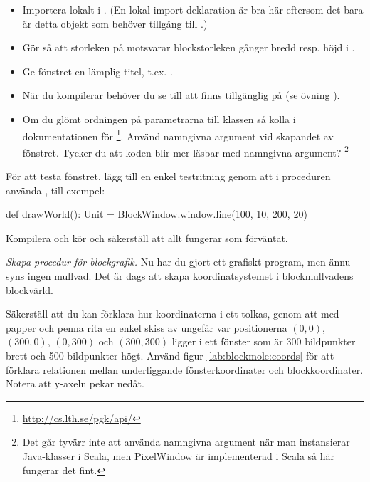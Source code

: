 \begin{itemize}%
  \item Importera  lokalt i . (En lokal import-deklaration är bra här eftersom det bara är detta objekt som behöver tillgång till .)
  \item Gör så att storleken på  motsvarar blockstorleken gånger bredd resp. höjd i .
  \item Ge fönstret en lämplig titel, t.ex. .
  \item När du kompilerar behöver du se till att  finns tillgänglig på  (se övning \texttt{\ExeWeekFOUR}).
  \item Om du glömt ordningen på parametrarna till klassen  så kolla i dokumentationen för  \footnote{\url{http://cs.lth.se/pgk/api/}}. Använd namngivna argument vid skapandet av fönstret. Tycker du att koden blir mer läsbar med namngivna argument? \footnote{Det går tyvärr inte att använda namngivna argument när man instansierar Java-klasser i Scala, men PixelWindow är implementerad i Scala så här fungerar det fint.}
\end{itemize}

För att testa fönstret, lägg till en enkel testritning genom att i proceduren  använda , till exempel:
\begin{Code}
  def drawWorld(): Unit = 
    BlockWindow.window.line(100, 10, 200, 20)
\end{Code}
Kompilera och kör och säkerställ att allt fungerar som förväntat.


\Task \emph{Skapa procedur för blockgrafik.} Nu har du gjort ett grafiskt program, men ännu syns ingen mullvad.
Det är dags att skapa koordinatsystemet i blockmullvadens blockvärld.

\Subtask\Pen
Säkerställ att du kan förklara hur koordinaterna i ett  tolkas, genom att med papper och penna rita en enkel skiss av ungefär var positionerna $(0,0)$, $(300, 0)$, $(0, 300)$ och $(300, 300)$ ligger i ett fönster som är 300 bildpunkter brett och 500 bildpunkter högt. Använd figur \ref{lab:blockmole:coords} för att förklara relationen mellan underliggande fönsterkoordinater och blockkoordinater. Notera att y-axeln pekar nedåt.

